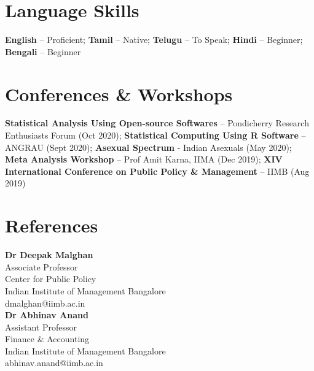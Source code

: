 \documentclass[a4paper,11pt]{article}
\newcommand{\sidebyside}[2]{
    \begin{multicols}{2}
    #1 \columnbreak
    #2 \end{multicols}
}
\begin{document}
\section{Language Skills}
\textbf{English} -- Proficient; \textbf{Tamil} -- Native; \textbf{Telugu} -- To Speak; \textbf{Hindi} -- Beginner; \textbf{Bengali} -- Beginner
\section{Conferences \& Workshops}

{\textbf{Statistical Analysis Using Open-source Softwares} -- Pondicherry Research Enthusiasts Forum (Oct 2020); \textbf{Statistical Computing Using R Software} -- ANGRAU (Sept 2020); \textbf{Asexual Spectrum} - Indian Asexuals (May 2020); \textbf{Meta Analysis Workshop} -- Prof Amit Karna, IIMA (Dec 2019); \textbf{XIV International Conference on Public Policy \& Management} -- IIMB (Aug 2019)}

\section{References}
\begin{multicols}{2}
{\textbf{Dr Deepak Malghan}\\ Associate Professor\\Center for Public Policy\\ Indian Institute of Management Bangalore\\ dmalghan@iimb.ac.in}\\

{\textbf{Dr Abhinav Anand}\\ Assistant Professor\\ Finance \& Accounting\\ Indian Institute of Management Bangalore\\ abhinav.anand@iimb.ac.in}
\end{multicols}

\end{document}
